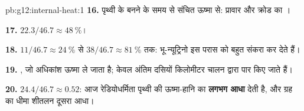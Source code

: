 \begin{solution}{pb:g12:internal-heat:1}
\textbf{16.} पृथ्वी के बनने के समय से संचित ऊष्मा से: प्रावार और क्रोड का
।

\textbf{17.} $22.3/46.7 \approx \qty{48}{\percent}$।

\textbf{18.} $11/46.7 \approx \qty{24}{\percent}$ से $38/46.7 \approx
\qty{81}{\percent}$ तक: भू-न्यूट्रिनो इस परास को बहुत संकरा कर देते हैं।

\textbf{19.} , जो अधिकांश ऊष्मा ले जाता है; केवल अंतिम
दसियों किलोमीटर चालन द्वारा पार किए जाते हैं।

\textbf{20.} $24.4/46.7 \approx 0.52$: आज रेडियोधर्मिता पृथ्वी की ऊष्मा-हानि का
\textbf{लगभग आधा} देती है, और ग्रह का धीमा शीतलन
दूसरा आधा।
\end{solution}
